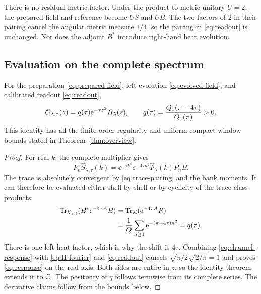 There is no residual metric factor. Under the product-to-metric unitary
$U=2$, the prepared field and reference become $US$ and $UB$.
The two factors of $2$ in their pairing cancel the angular metric
measure $1/4$, so the pairing in \eqref{eq:readout} is unchanged.
Nor does the adjoint $B^*$ introduce right-hand heat evolution.

\subsection{Evaluation on the complete spectrum}

\begin{theorem}
\label{thm:response}
For the preparation \eqref{eq:prepared-field}, left evolution
\eqref{eq:evolved-field}, and calibrated readout \eqref{eq:readout},
\begin{equation}
 \mathcal O_{\lambda,\tau}(z)
  =q(\tau)\mathrm e^{-\tau z^2}H_\lambda(z),
 \qquad q(\tau)=\frac{Q_1(\pi+4\tau)}{Q_1(\pi)}>0.
 \label{eq:response}
\end{equation}
This identity has all the finite-order regularity and uniform compact
window bounds stated in Theorem~\ref{thm:overview}.
\end{theorem}

\begin{proof}
For real $k$, the complete multiplier gives
\begin{equation}
 P_n\widehat S_{\lambda,\tau}(k)
 =\ee^{-\tau k^2}\ee^{-4\tau n^2}
     \widehat F_\lambda(k)P_nB.
 \label{eq:channel-response}
\end{equation}
The trace is absolutely convergent by \eqref{eq:trace-pairing} and the
bank moments. It can therefore be evaluated either shell by shell or
by cyclicity of the trace-class products:
\begin{align}
 \operatorname{Tr}_{\mathcal K_{\mathrm{ref}}}(B^*\mathrm e^{-4\tau A}B)
 &=\operatorname{Tr}_\mathcal K(\mathrm e^{-4\tau A}R)
 \nonumber\\
 &=\frac1Q\sum_{n\ge1}\mathrm e^{-(\pi+4\tau)n^2}
  =q(\tau).
 \label{eq:trace-q}
\end{align}
There is one left heat factor, which is why the shift is $4\tau$.
Combining \eqref{eq:channel-response} with
\eqref{eq:H-fourier} and \eqref{eq:readout} cancels
$\sqrt{\pi/2}\sqrt{2/\pi}=1$ and proves \eqref{eq:response} on
the real axis. Both sides are entire in $z$, so the identity theorem
extends it to $\mathbb C$. The positivity of $q$ follows termwise from its
complete series. The derivative claims follow from the bounds below.
\end{proof}

